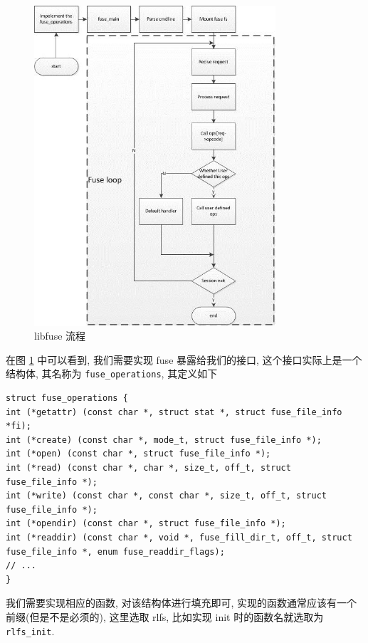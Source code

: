 \begin{figure}[H]
    \centerline{\includegraphics[width=0.8\textwidth]{./Figures/fuseflow.png}}
    \caption{libfuse 流程}
    \label{fig:fuseflow}
\end{figure}

在图 \ref{fig:fuseflow} 中可以看到, 我们需要实现 fuse 暴露给我们的接口,
这个接口实际上是一个结构体, 其名称为 \verb|fuse_operations|, 其定义如下

\begin{lstlisting}[style=verb]
struct fuse_operations {
int (*getattr) (const char *, struct stat *, struct fuse_file_info *fi);
int (*create) (const char *, mode_t, struct fuse_file_info *);
int (*open) (const char *, struct fuse_file_info *);
int (*read) (const char *, char *, size_t, off_t, struct fuse_file_info *);
int (*write) (const char *, const char *, size_t, off_t, struct fuse_file_info *);
int (*opendir) (const char *, struct fuse_file_info *);
int (*readdir) (const char *, void *, fuse_fill_dir_t, off_t, struct fuse_file_info *, enum fuse_readdir_flags);
// ...
}
\end{lstlisting}

我们需要实现相应的函数, 对该结构体进行填充即可, 实现的函数通常应该有一个前缀(但是不是必须的),
这里选取 rlfs, 比如实现 init 时的函数名就选取为 \verb|rlfs_init|.

